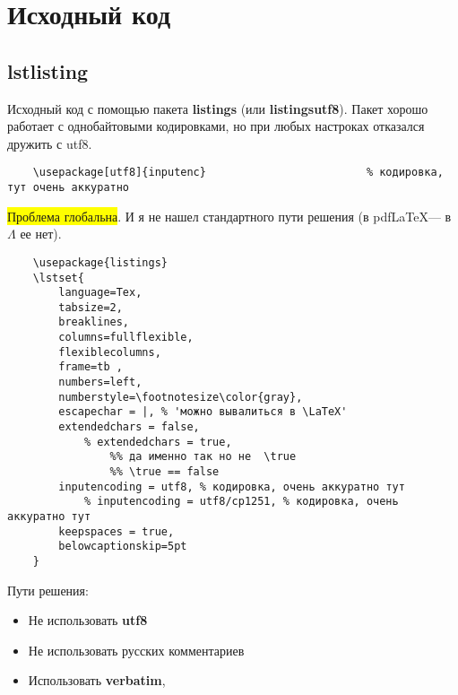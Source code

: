 \section[Исходный код]{Исходный код}

\subsection{lstlisting}

Исходный код с помощью пакета \textbf{listings} (или \textbf{listingsutf8}).
Пакет хорошо работает с однобайтовыми кодировками, но при любых настроках отказался дружить с utf8.

\begin{lstlisting}
	\usepackage[utf8]{inputenc}							% кодировка, тут очень аккуратно
\end{lstlisting}

\colorbox{yellow}{Проблема глобальна}.
И я не нашел стандартного пути решения (в pdf\LaTeX --- в $\Lambda$ ее нет).

\begin{lstlisting}[escapeinside='', firstnumber=100]
	%\usepackage{listingsutf8}	
	\usepackage{listings}
	\lstset{
		language=Tex,
		tabsize=2,
		breaklines,
		columns=fullflexible,
		flexiblecolumns,
		frame=tb ,
		numbers=left,
		numberstyle=\footnotesize\color{gray},
		escapechar = |, % 'можно вывалиться в \LaTeX' 
		extendedchars = false,
			% extendedchars = true, 
				%% да именно так но не  \true
				%% \true == false
		inputencoding = utf8, % кодировка, очень аккуратно тут
			% inputencoding = utf8/cp1251, % кодировка, очень аккуратно тут
		keepspaces = true,
		belowcaptionskip=5pt
	}
\end{lstlisting}

Пути решения:
\begin{itemize}
	\item Не использовать \textbf{utf8}
	\item Не использовать русских комментариев
	\item Использовать \textbf{verbatim}, 
\end{itemize}

\pagebreak

